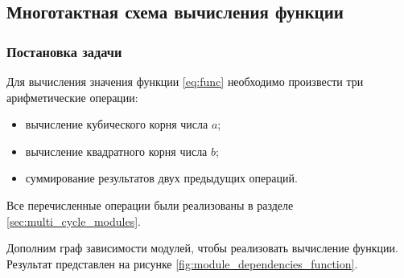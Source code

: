 \subsection{Многотактная схема вычисления функции}

\subsubsection{Постановка задачи}

Для вычисления значения функции \eqref{eq:func} необходимо произвести три арифметические операции:
\begin{itemize}
    \item вычисление кубического корня числа $a$;
    \item вычисление квадратного корня числа $b$;
    \item суммирование результатов двух предыдущих операций.
\end{itemize}

Все перечисленные операции были реализованы в разделе \ref{sec:multi_cycle_modules}.

Дополним граф зависимости модулей, чтобы реализовать вычисление функции. Результат представлен на рисунке \ref{fig:module_dependencies_function}.

